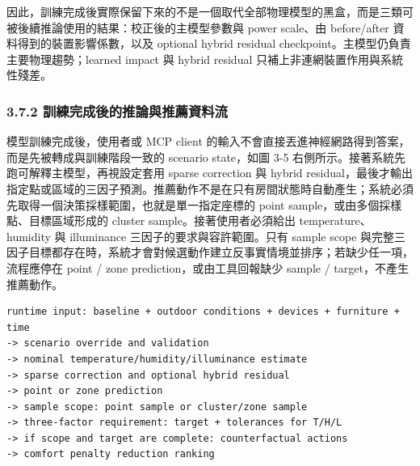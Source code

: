 \documentclass[12pt,a4paper]{article}
\begin{document}
因此，訓練完成後實際保留下來的不是一個取代全部物理模型的黑盒，而是三類可被後續推論使用的結果：校正後的主模型參數與 power scale、由 before/after 資料得到的裝置影響係數，以及 optional hybrid residual checkpoint。主模型仍負責主要物理趨勢；learned impact 與 hybrid residual 只補上非連網裝置作用與系統性殘差。


\subsubsection*{3.7.2 訓練完成後的推論與推薦資料流}

模型訓練完成後，使用者或 MCP client 的輸入不會直接丟進神經網路得到答案，而是先被轉成與訓練階段一致的 scenario state，如圖 3-5 右側所示。接著系統先跑可解釋主模型，再視設定套用 sparse correction 與 hybrid residual，最後才輸出指定點或區域的三因子預測。推薦動作不是在只有房間狀態時自動產生；系統必須先取得一個決策採樣範圍，也就是單一指定座標的 point sample，或由多個採樣點、目標區域形成的 cluster sample。接著使用者必須給出 temperature、humidity 與 illuminance 三因子的要求與容許範圍。只有 sample scope 與完整三因子目標都存在時，系統才會對候選動作建立反事實情境並排序；若缺少任一項，流程應停在 point / zone prediction，或由工具回報缺少 sample / target，不產生推薦動作。


\begin{lstlisting}[basicstyle=\footnotesize\ttfamily,breaklines=true,columns=flexible]
runtime input: baseline + outdoor conditions + devices + furniture + time
-> scenario override and validation
-> nominal temperature/humidity/illuminance estimate
-> sparse correction and optional hybrid residual
-> point or zone prediction
-> sample scope: point sample or cluster/zone sample
-> three-factor requirement: target + tolerances for T/H/L
-> if scope and target are complete: counterfactual actions
-> comfort penalty reduction ranking
\end{lstlisting}
\end{document}
